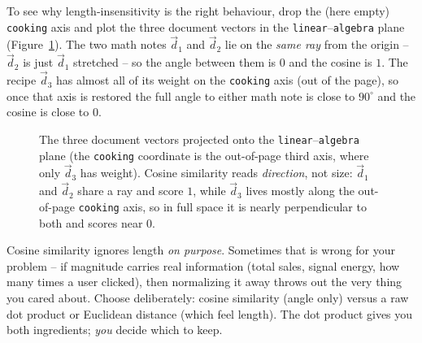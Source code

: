 To see why length-insensitivity is the right behaviour, drop the (here empty)
\texttt{cooking} axis and plot the three document vectors in the
\texttt{linear}--\texttt{algebra} plane (Figure~\ref{ch04:cosine}). The two math
notes $\vec d_1$ and $\vec d_2$ lie on the \emph{same ray} from the origin --
$\vec d_2$ is just $\vec d_1$ stretched -- so the angle between them is $0$ and the
cosine is $1$. The recipe $\vec d_3$ has almost all of its weight on the
\texttt{cooking} axis (out of the page), so once that axis is restored the full
angle to either math note is close to $90^\circ$ and the cosine is close to $0$.

\begin{figure}[H]
\centering
{}
\caption{The three document vectors projected onto the
\texttt{linear}--\texttt{algebra} plane (the \texttt{cooking} coordinate is the
out-of-page third axis, where only $\vec d_3$ has weight). Cosine similarity reads
\emph{direction}, not size: $\vec d_1$ and $\vec d_2$ share a ray and score $1$,
while $\vec d_3$ lives mostly along the out-of-page \texttt{cooking} axis, so in
full space it is nearly perpendicular to both and scores near $0$.}
\label{ch04:cosine}
\end{figure}

\begin{trapbox}
Cosine similarity ignores length \emph{on purpose}. Sometimes that is wrong for your
problem -- if magnitude carries real information (total sales, signal energy, how
many times a user clicked), then normalizing it away throws out the very thing you
cared about. Choose deliberately: cosine similarity (angle only) versus a raw dot
product or Euclidean distance (which feel length). The dot product gives you both
ingredients; \emph{you} decide which to keep.
\end{trapbox}


